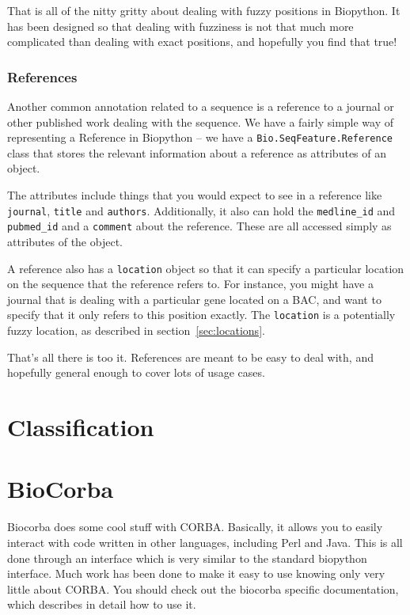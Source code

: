 \documentclass{report}
\begin{document}
That is all of the nitty gritty about dealing with fuzzy positions in Biopython. It has been designed so that dealing with fuzziness is not that much more complicated than dealing with exact positions, and hopefully you find that true!
 
\subsubsection{References}

Another common annotation related to a sequence is a reference to a journal or other published work dealing with the sequence. We have a fairly simple way of representing a Reference in Biopython -- we have a \verb|Bio.SeqFeature.Reference| class that stores the relevant information about a reference as attributes of an object.


The attributes include things that you would expect to see in a reference like \verb|journal|, \verb|title| and \verb|authors|. Additionally, it also can hold the \verb|medline_id| and \verb|pubmed_id| and a \verb|comment| about the reference. These are all accessed simply as attributes of the object.


A reference also has a \verb|location| object so that it can specify a particular location on the sequence that the reference refers to. For instance, you might have a journal that is dealing with a particular gene located on a BAC, and want to specify that it only refers to this position exactly. The \verb|location| is a potentially fuzzy location, as described in section~\ref{sec:locations}.


That's all there is too it. References are meant to be easy to deal with, and hopefully general enough to cover lots of usage cases.

\section{Classification}

\section{BioCorba}

Biocorba does some cool stuff with CORBA. Basically, it allows you to easily interact with code written in other languages, including Perl and Java. This is all done through an interface which is very similar to the standard biopython interface. Much work has been done to make it easy to use knowing only very little about CORBA. You should check out the biocorba specific documentation, which describes in detail how to use it.
\end{document}
